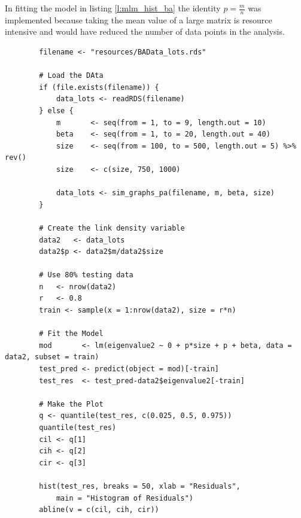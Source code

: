 \documentclass[11pt, twoside]{report}
\begin{document}
In fitting the model in listing \ref{l:mlm_hist_ba} the identity \(p = \frac{m}{n}\) was implemented because taking the mean value of a large matrix is resource intensive and would have reduced the number of data points in the analysis.


\begin{listing}[htbp]
    \begin{tcolorbox}
        \begin{verbatim}
        filename <- "resources/BAData_lots.rds"

        # Load the DAta
        if (file.exists(filename)) {
            data_lots <- readRDS(filename)
        } else {
            m       <- seq(from = 1, to = 9, length.out = 10)
            beta    <- seq(from = 1, to = 20, length.out = 40)
            size    <- seq(from = 100, to = 500, length.out = 5) %>% rev()
            size    <- c(size, 750, 1000)

            data_lots <- sim_graphs_pa(filename, m, beta, size)
        }

        # Create the link density variable
        data2   <- data_lots
        data2$p <- data2$m/data2$size

        # Use 80% testing data
        n   <- nrow(data2)
        r   <- 0.8
        train <- sample(x = 1:nrow(data2), size = r*n)

        # Fit the Model
        mod       <- lm(eigenvalue2 ~ 0 + p*size + p + beta, data = data2, subset = train)
        test_pred <- predict(object = mod)[-train]
        test_res  <- test_pred-data2$eigenvalue2[-train]

        # Make the Plot
        q <- quantile(test_res, c(0.025, 0.5, 0.975))
        quantile(test_res)
        cil <- q[1]
        cih <- q[2]
        cir <- q[3]

        hist(test_res, breaks = 50, xlab = "Residuals",
            main = "Histogram of Residuals")
        abline(v = c(cil, cih, cir))

        \end{verbatim}
    \end{tcolorbox}
\caption{\label{l:mlm_hist_ba}l:mlm\textsubscript{hist}\textsubscript{ba}}
\end{listing}
\end{document}
